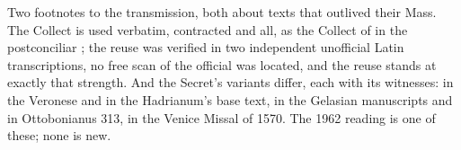 Two footnotes to the transmission, both about texts that outlived their Mass.
The Collect is used verbatim, contracted  and all, as the Collect
of  in the postconciliar ; the reuse was verified in two independent unofficial Latin
transcriptions, no free scan of the official  was
located, and the reuse stands at exactly that strength. And the Secret's
variants differ, each with its witnesses:  in the
Veronese and in the Hadrianum's base text,  in the Gelasian
manuscripts and in Ottobonianus 313,  in the
Venice Missal of 1570. The 1962 reading is one of these; none is new.
